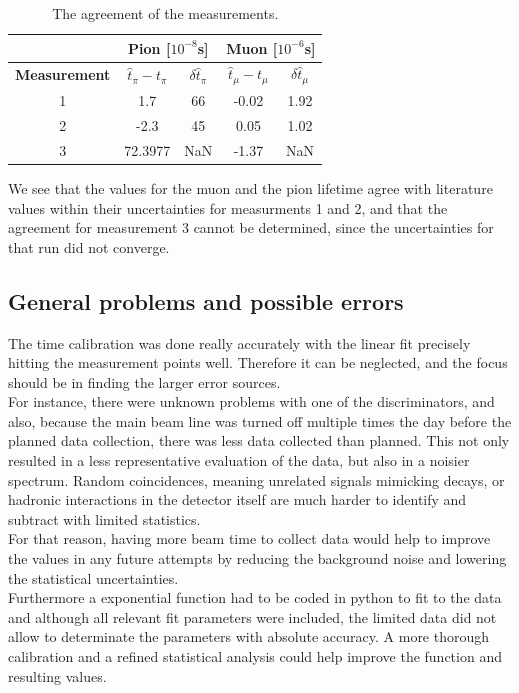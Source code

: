 \documentclass[11pt,a4paper]{article}
\begin{document}
\begin{table}[ht!]
\centering
\begin{tabular}{|c|c|c|c|c|}
\hline
&\multicolumn{2}{|c|}{\textbf{Pion [$10^{-8}$s]}} 
&\multicolumn{2}{|c|}{\textbf{Muon [$10^{-6}$s]}} \\
\hline
\textbf{Measurement} & \(\hat t_\pi - t_\pi\) & \(\delta \hat t_\pi\) & \(\hat t_\mu - t_\mu\) & \(\delta \hat t_\mu\) \\
\hline
1 & 1.7 & 66&-0.02&1.92 \\
2 &-2.3&45&0.05&1.02 \\
3 &72.3977&NaN&-1.37&NaN \\
\hline
\end{tabular}
    \caption{The agreement of the measurements.}
    \label{tab:measurement_agreement}
\end{table}

We see that the values for the muon and the pion lifetime agree with literature values within their uncertainties for measurments 1 and 2, and that the agreement for measurement 3 cannot be determined, since the uncertainties for that run did not converge. 



\subsection{General problems and possible errors}
The time calibration was done really accurately with the linear fit precisely hitting the measurement points well. Therefore it can be neglected, and the focus should be in finding the larger error sources. \\
For instance, there were unknown problems with one of the discriminators, and also, because
the main beam line was turned off multiple times the day before the planned data collection, there was less data collected than planned. 
This not only resulted in a less representative evaluation of the data, but also in a noisier spectrum. Random coincidences, meaning unrelated signals mimicking decays, or hadronic interactions in the detector itself are much harder to identify and subtract with limited statistics. \\
For that reason, having more beam time to collect data would help to improve the values in any future attempts by reducing the background noise and lowering the statistical uncertainties. \\ Furthermore a exponential function had to be coded in python to fit to the data and although all relevant fit parameters were included, the limited data did not allow to determinate the parameters with absolute accuracy. A more thorough calibration and a refined statistical analysis could help improve the function and resulting values.
\end{document}
